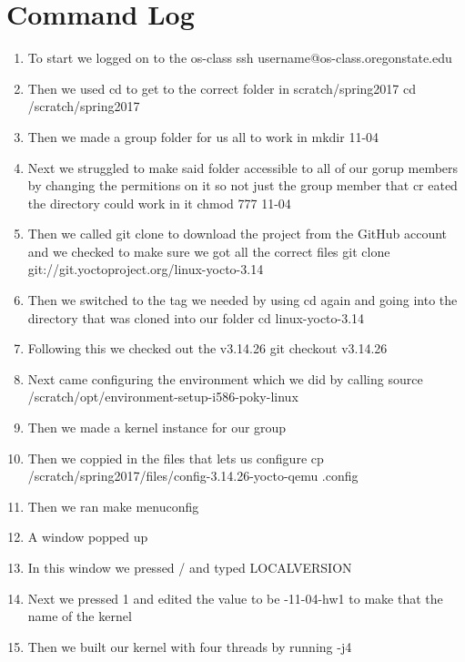 \section{Command Log}
\begin{enumerate}
    \item To start we logged on to the os-class \textcolor{povcodered}{ssh username@os-class.oregonstate.edu}
 \item Then we used cd to get to the correct folder in scratch/spring2017 \textcolor{povcodered}{cd /scratch/spring2017}
 \item Then we made a group folder for us all to work in \textcolor{povcodered}{mkdir 11-04}
 \item Next we struggled to make said folder accessible to all of our gorup members by changing the permitions on it so not just the group member that cr    eated the directory could work in it \textcolor{povcodered}{chmod 777 11-04}
 \item Then we called git clone to download the project from the GitHub account and we checked to make sure we got all the correct files \textcolor{povcodered}{git clone git://git.yoctoproject.org/linux-yocto-3.14}
 \item Then we switched to the tag we needed by using cd again and going into the directory that was cloned into our folder \textcolor{povcodered}{cd linux-yocto-3.14}
 \item Following this we checked out the v3.14.26 \textcolor{povcodered}{git checkout v3.14.26}
 \item Next came configuring the environment which we did by calling \textcolor{povcodered}{source /scratch/opt/environment-setup-i586-poky-linux}
    \item Then we made a kernel instance for our group
 \item Then we coppied in the files that lets us configure \textcolor{povcodered}{cp /scratch/spring2017/files/config-3.14.26-yocto-qemu .config}
 \item Then we ran \textcolor{povcodered}{make menuconfig}
    \item A window popped up
 \item In this window we pressed \textcolor{povcodered}{/} and typed \textcolor{povcodered}{LOCALVERSION}
 \item Next we pressed \textcolor{povcodered}{1} and edited the value to be \textcolor{povcodered}{-11-04-hw1} to make that the name of the kernel
 \item Then we built our kernel with four threads by running \textcolor{povcodered}{-j4}

\end{enumerate}
